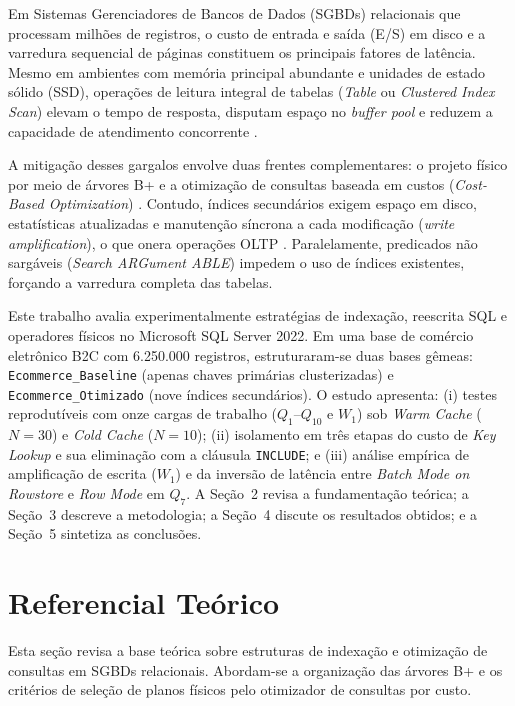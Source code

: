 \documentclass[12pt]{article}
\begin{document}
Em Sistemas Gerenciadores de Bancos de Dados (SGBDs) relacionais que processam milhões de registros, o custo de entrada e saída (E/S) em disco e a varredura sequencial de páginas constituem os principais fatores de latência. Mesmo em ambientes com memória principal abundante e unidades de estado sólido (SSD), operações de leitura integral de tabelas (\textit{Table} ou \textit{Clustered Index Scan}) elevam o tempo de resposta, disputam espaço no \textit{buffer pool} e reduzem a capacidade de atendimento concorrente \cite{silberschatz:20,ramakrishnan:03}.

A mitigação desses gargalos envolve duas frentes complementares: o projeto físico por meio de árvores B+ e a otimização de consultas baseada em custos (\textit{Cost-Based Optimization}) \cite{selinger:79,chaudhuri:98}. Contudo, índices secundários exigem espaço em disco, estatísticas atualizadas e manutenção síncrona a cada modificação (\textit{write amplification}), o que onera operações OLTP \cite{comer:79,elmasri:16}. Paralelamente, predicados não sargáveis (\textit{Search ARGument ABLE}) impedem o uso de índices existentes, forçando a varredura completa das tabelas.

Este trabalho avalia experimentalmente estratégias de indexação, reescrita SQL e operadores físicos no Microsoft SQL Server 2022. Em uma base de comércio eletrônico B2C com 6.250.000 registros, estruturaram-se duas bases gêmeas: \texttt{Ecommerce\_Baseline} (apenas chaves primárias clusterizadas) e \texttt{Ecommerce\_Otimizado} (nove índices secundários). O estudo apresenta: (i) testes reprodutíveis com onze cargas de trabalho ($Q_1$--$Q_{10}$ e $W_1$) sob \textit{Warm Cache} ($N=30$) e \textit{Cold Cache} ($N=10$); (ii) isolamento em três etapas do custo de \textit{Key Lookup} e sua eliminação com a cláusula \texttt{INCLUDE}; e (iii) análise empírica de amplificação de escrita ($W_1$) e da inversão de latência entre \textit{Batch Mode on Rowstore} e \textit{Row Mode} em $Q_7$. A Seção~2 revisa a fundamentação teórica; a Seção~3 descreve a metodologia; a Seção~4 discute os resultados obtidos; e a Seção~5 sintetiza as conclusões.

\section{Referencial Teórico}

Esta seção revisa a base teórica sobre estruturas de indexação e otimização de consultas em SGBDs relacionais. Abordam-se a organização das árvores B+ e os critérios de seleção de planos físicos pelo otimizador de consultas por custo.
\end{document}
